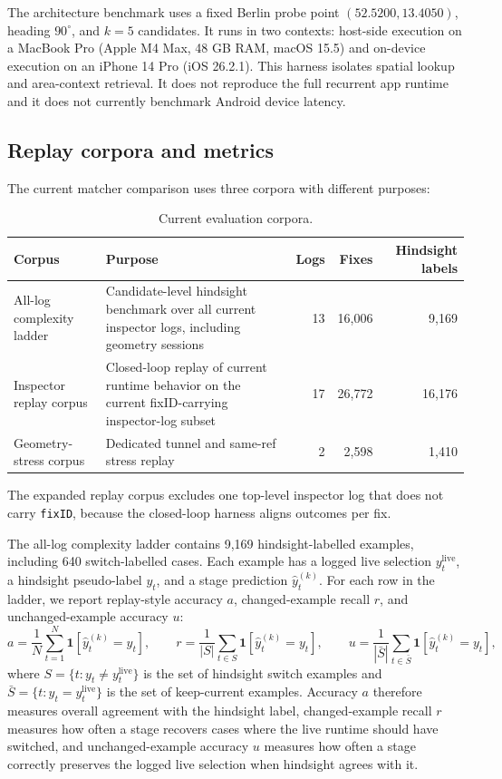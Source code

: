 \documentclass{article}
\begin{document}
The architecture benchmark uses a fixed Berlin probe point \((52.5200,13.4050)\), heading \(90^\circ\), and \(k=5\) candidates. It runs in two contexts: host-side execution on a MacBook Pro (Apple M4 Max, 48 GB RAM, macOS 15.5) and on-device execution on an iPhone 14 Pro (iOS 26.2.1). This harness isolates spatial lookup and area-context retrieval. It does not reproduce the full recurrent app runtime and it does not currently benchmark Android device latency.

\subsection{Replay corpora and metrics}
The current matcher comparison uses three corpora with different purposes:
\begin{table}[!htbp]
\centering
\caption{Current evaluation corpora.}
\label{tab:corpora}
\begin{tabular}{p{3.1cm}p{5.6cm}rrr}
\toprule
Corpus & Purpose & Logs & Fixes & Hindsight labels \\
\midrule
All-log complexity ladder & Candidate-level hindsight benchmark over all current inspector logs, including geometry sessions & 13 & 16{,}006 & 9{,}169 \\
Inspector replay corpus & Closed-loop replay of current runtime behavior on the current fixID-carrying inspector-log subset & 17 & 26{,}772 & 16{,}176 \\
Geometry-stress corpus & Dedicated tunnel and same-ref stress replay & 2 & 2{,}598 & 1{,}410 \\
\bottomrule
\end{tabular}
\end{table}

The expanded replay corpus excludes one top-level inspector log that does not carry \texttt{fixID}, because the closed-loop harness aligns outcomes per fix.

The all-log complexity ladder contains 9{,}169 hindsight-labelled examples, including 640 switch-labelled cases. Each example has a logged live selection \(y_t^{\mathrm{live}}\), a hindsight pseudo-label \(y_t\), and a stage prediction \(\hat y_t^{(k)}\). For each row in the ladder, we report replay-style accuracy \(a\), changed-example recall \(r\), and unchanged-example accuracy \(u\):
\[
a = \frac{1}{N}\sum_{t=1}^{N}\mathbf{1}\!\left[\hat y_t^{(k)} = y_t\right],
\qquad
r = \frac{1}{|S|}\sum_{t \in S}\mathbf{1}\!\left[\hat y_t^{(k)} = y_t\right],
\qquad
u = \frac{1}{|\bar S|}\sum_{t \in \bar S}\mathbf{1}\!\left[\hat y_t^{(k)} = y_t\right],
\]
where \(S=\{t: y_t \neq y_t^{\mathrm{live}}\}\) is the set of hindsight switch examples and \(\bar S=\{t: y_t = y_t^{\mathrm{live}}\}\) is the set of keep-current examples. Accuracy \(a\) therefore measures overall agreement with the hindsight label, changed-example recall \(r\) measures how often a stage recovers cases where the live runtime should have switched, and unchanged-example accuracy \(u\) measures how often a stage correctly preserves the logged live selection when hindsight agrees with it.
\end{document}
